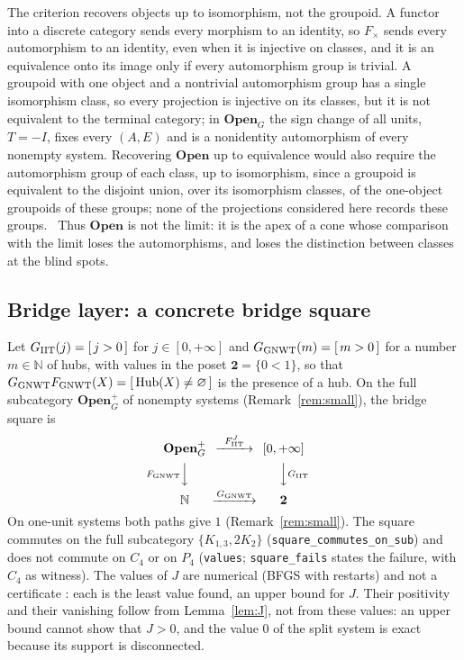 The criterion recovers objects up to isomorphism, not the groupoid. A functor into a discrete category sends every morphism to an identity, so $F_\times$ sends every automorphism to an identity, even when it is injective on classes, and it is an equivalence onto its image only if every automorphism group is trivial. A groupoid with one object and a nontrivial automorphism group has a single isomorphism class, so every projection is injective on its classes, but it is not equivalent to the terminal category; in $\mathbf{Open}_G$ the sign change of all units, $T=-I$, fixes every $(A,E)$ and is a nonidentity automorphism of every nonempty system. Recovering $\mathbf{Open}$ up to equivalence would also require the automorphism group of each class, up to isomorphism, since a groupoid is equivalent to the disjoint union, over its isomorphism classes, of the one-object groupoids of these groups; none of the projections considered here records these groups. \stA\ Thus $\mathbf{Open}$ is not the limit: it is the apex of a cone whose comparison with the limit loses the automorphisms, and loses the distinction between classes at the blind spots.

\subsection{Bridge layer: a concrete bridge square}\label{sec:puentes}
Let $G_{\rm IIT}(j)=[\,j>0\,]$ for $j\in[0,+\infty]$ and $G_{\rm GNWT}(m)=[\,m>0\,]$ for a number $m\in\mathbb N$ of hubs, with values in the poset $\mathbf 2=\{0<1\}$, so that $G_{\rm GNWT}F_{\rm GNWT}(X)=[\,\mathrm{Hub}(X)\ne\varnothing\,]$ is the presence of a hub. On the full subcategory $\mathbf{Open}_G^{+}$ of nonempty systems (Remark~\ref{rem:small}), the bridge square is
\begin{equation}
\begin{CD}
\mathbf{Open}_G^{+} @>{F_{\rm IIT}^J}>> [0,+\infty]\\
@V{F_{\rm GNWT}}VV @VV{G_{\rm IIT}}V\\
\mathbb N @>{G_{\rm GNWT}}>> \mathbf 2
\end{CD}
\end{equation}
On one-unit systems both paths give $1$ (Remark~\ref{rem:small}). The square commutes on the full subcategory $\{K_{1,3},2K_2\}$ (\texttt{square\_commutes\_on\_sub}) and does not commute on $C_4$ or on $P_4$ (\texttt{values}; \texttt{square\_fails} states the failure, with $C_4$ as witness). The values of $J$ are numerical (BFGS with restarts) and not a certificate \stN: each is the least value found, an upper bound for $J$. Their positivity and their vanishing follow from Lemma~\ref{lem:J}, not from these values: an upper bound cannot show that $J>0$, and the value $0$ of the split system is exact because its support is disconnected.

